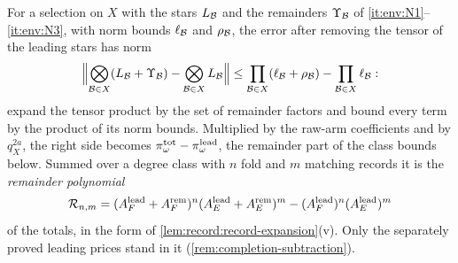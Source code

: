 For a selection on $X$ with the stars $L_\mathcal B$ and the remainders $\Upsilon_\mathcal B$ of
\ref{it:env:N1}--\ref{it:env:N3}, with norm bounds $\ell_\mathcal B$ and $\rho_\mathcal B$, the error
after removing the tensor of the leading stars has norm
\begin{equation}\label{eq:oct24:star-tensor-error}
 \Bigl\|\bigotimes_{\mathcal B\in X}(L_\mathcal B+\Upsilon_\mathcal B)-\bigotimes_{\mathcal B\in X}L_\mathcal B\Bigr\|
 \le\prod_{\mathcal B\in X}(\ell_\mathcal B+\rho_\mathcal B)-\prod_{\mathcal B\in X}\ell_\mathcal B :
\end{equation}
expand the tensor product by the set of remainder factors and bound every term by
the product of its norm bounds. Multiplied by the raw-arm coefficients and by
$q_X^{2a}$, the right side becomes $\pi^{\rm tot}_\omega-\pi^{\rm lead}_\omega$, the
remainder part of the class bounds below. Summed over a degree class with $n$ fold
and $m$ matching records it is the \emph{remainder polynomial}
\[
 \mathcal R_{n,m}=(A^{\rm lead}_F+A^{\rm rem}_F)^n(A^{\rm lead}_E+A^{\rm rem}_E)^m
 -(A^{\rm lead}_F)^n(A^{\rm lead}_E)^m
\]
of the totals, in the form of \cref{lem:record:record-expansion}(v). Only the
separately proved leading prices stand in it (\cref{rem:completion-subtraction}).

